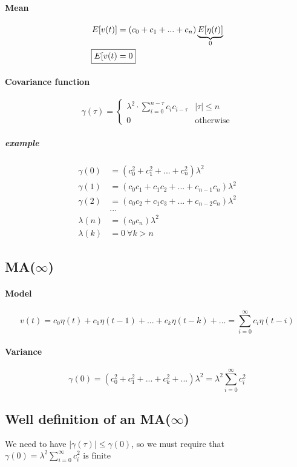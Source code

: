 \documentclass{report}
\begin{document}
\paragraph{Mean}
\begin{alignat*}{2}
E[v(t)]&=(c_0+c_1+...+c_n)\underbrace{E[\eta(t)]}_0\\
\Aboxed{E[v(t)&=0}
\end{alignat*}

\paragraph{Covariance function}
\[
\boxed{
\gamma(\tau)=
\begin{cases}
\lambda^2\cdot \sum_{i=0}^{n-\tau} c_ic_{i-\tau}	&	|\tau|\leq n\\
0	& \text{otherwise}
\end{cases}
}
\]
\subparagraph{example}
\begin{align*}
\gamma(0)&=(c_0^2+c_1^2+...+c_n^2)\lambda^2\\
\gamma(1)&=(c_0c_1+c_1c_2+...+c_{n-1}c_n)\lambda^2\\
\gamma(2)&=(c_0c_2+c_1c_3+...+c_{n-2}c_n)\lambda^2\\
&...\\
\lambda(n)&=(c_0c_n)\lambda^2\\
\lambda(k)&=0\:\forall k>n
\end{align*}

\subsection{MA($\infty$)}
\paragraph{Model}
\[
v(t)=c_0\eta(t)+c_1\eta(t-1)+...+c_k\eta(t-k)+...=\sum_{i=0}^{\infty}c_i\eta(t-i)
\]
\paragraph{Variance}
\[
\gamma(0)
=(c_0^2+c_1^2+...+c_k^2+...) \lambda^2
=\lambda^2 \sum_{i=0}^{\infty} c_i^2
\]
\subsection{Well definition of an MA($\infty$)}
We need to have $|\gamma(\tau)|\leq \gamma(0)$, so we must require that \\
$\boxed{ \gamma(0)=\lambda^2 \sum_{i=0}^{\infty} c_i^2 \text{ is finite}}$
\end{document}
